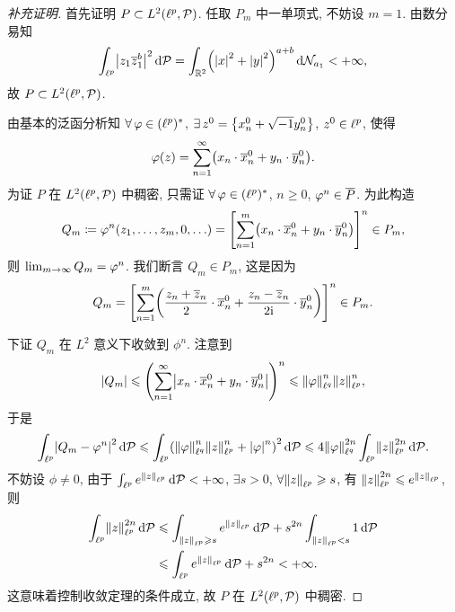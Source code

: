 \begin{proof}[补充证明]
首先证明 $P\subset L^2\xk{\lp,\PP}$. 任取 $P_{m}$ 中一单项式, 不妨设 $m=1$. 由数分易知
\[\int_{\lp}\jd{z_{1}\mean{z}{}_{1}^{b}}^{2}\dd\PP=\int_{\rr^{2}}\xk{\jd{x}^{2}+\jd{y}^{2}}^{a+b}\dd\NN_{a_{1}}<+\infty,\]
故 $P\subset L^2\xk{\lp,\PP}$.\par 
由基本的泛函分析知 $\forall \phi\in\colp$, $\exists z^{0}=\dk{x_{n}^{0}+\xs y_{n}^{0}}$, $z^{0}\in\ell^p$, 使得
\[\phi\xk{z}=\sum_{n=1}^{\infty}\xk{x_{n}\cdot\mean{x}{}_{n}^{0}+y_{n}\cdot\mean{y}{}_{n}^{0}}.\]
为证 $P$ 在 $L^2\xk{\lp,\PP}$ 中稠密, 只需证 $\forall\phi\in\colp$, $n\geq 0$, $\varphi^{n}\in\overline{P}$. 为此构造
\[Q_{m}\dy\phi^{n}\xk{z_{1},\dots,z_{m},0,\ldots}=\zk{\sum_{n=1}^{m}\xk{x_{n}\cdot\mean{x}{}_{n}^{0}+y_{n}\cdot\mean{y}{}_{n}^{0}}}^n\in P_{m},\]
则 $\lim _{m\to\infty}Q_{m}=\varphi^{n}$. 我们断言 $Q_{m}\in P_{m}$, 这是因为
\[Q_{m}=\zk{\sum_{n=1}^{m}\xk{\frac{z_{n}+\mean{z}{}_{n}}{2}\cdot\mean{x}{}_{n}^{0}+\frac{z_{n}-\mean{z}{}_{n}}{2\ii}\cdot\mean{y}{}_{n}^{0}}}^{n}\in P_{m}.\]

下证 $Q_{m}$ 在 $L^{2}$ 意义下收敛到 $\phi^{n}$. 注意到
\[\jd{Q_{m}}\leq\xk{\sum_{n=1}^{\infty}\jd{x_{n}\cdot\mean{x}{}_{n}^{0}+y_{n}\cdot\mean{y}{}_{n}^{0}}}^{n}\leq\fs{\phi}_{\ell^q}^{n}\fs{z}_{\ell^p}^{n},\]
于是
\[\int_{\lp}\jd{Q_{m}-\phi^{n}}^{2}\dd\PP\leq\int_{\lp}\xk{\fs{\phi}_{\ell^q}^{n}\fs{z}_{\ell^p}^{n}+\jd{\phi}^{n}}^{2}\dd\PP\leq 4\fs{\phi}_{\ell^q}^{2n}\int_{\lp}\fs{z}_{\ell^p}^{2n}\dd\PP.\]
不妨设 $\phi\neq 0$, 由于 $\int_{\ell^p}e^{\left\Vert z\right\Vert_{\ell^p}}\,\mathrm{d}\mathcal{P}<+\infty$, $\exists s>0$, $\forall\fs{z}_{\lp}\geq s$, 有 $\left\Vert z\right\Vert_{\ell^p}^{2n}\leqslant e^{\left\Vert z\right\Vert_{\ell^p}}$, 则
\begin{align*}
\int_{\lp}\fs{z}_{\lp}^{2n}\dd\PP &\leq \int_{\fs{z}_{\lp}\geq s}e^{\fs{z}_{\lp}}\dd\PP+s^{2n}\int_{\fs{z}_{\lp}<s}1\dd\PP\\
&\leq \int_{\lp}e^{\fs{z}_{\lp}}\dd\PP+s^{2n}<+\infty.
\end{align*}
这意味着控制收敛定理的条件成立, 故 $P$ 在 $L^2\xk{\lp,\PP}$ 中稠密.
\end{proof}